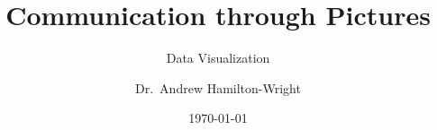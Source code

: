 \documentclass{beamer}
\title{Communication through Pictures}
\subtitle{Data Visualization}
\author{Dr.~Andrew Hamilton-Wright}
\institute{School of Computer Science\\
University of Guelph\\
\url{https://github.com/andrewhw/VizThoughts}}
\date{\today}
\newcommand{\key}[1]{\textcolor{keyred}{{\bf #1}}}
\begin{document}


\newcommand*\oldmacro{}%
\let\oldmacro\insertshorttitle%
\renewcommand*\insertshorttitle{%
  \oldmacro\hfill%
\insertframenumber\,/\,\inserttotalframenumber}

\begin{frame}
    \titlepage
\end{frame}



\end{document}
